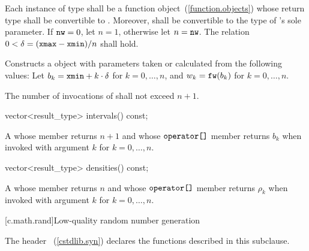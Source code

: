 \begin{itemdescr}
\pnum\requires
 Each instance of type 
 shall be a function object~(\ref{function.objects})
 whose return type shall be convertible to .
 Moreover,
  shall be convertible
 to the type of 's sole parameter.
 If $ \texttt{nw} = 0 $, let $ n = 1 $, otherwise let $n = \texttt{nw}$.
 The relation $ 0 < \delta = (\texttt{xmax} - \texttt{xmin}) / n $
 shall hold.

\pnum\effects Constructs a  object
 with parameters taken or calculated
 from the following values:
 Let $ b_k = \texttt{xmin} + k \cdot \delta $ for $ k = 0, \ldots, n $,
 and $ w_k = \texttt{fw}(b_k) $ for $ k = 0, \ldots, n $.

\pnum\complexity
 The number of invocations of  shall not exceed $n+1$.
\end{itemdescr}

%
\begin{itemdecl}
vector<result_type> intervals() const;
\end{itemdecl}

\begin{itemdescr}
\pnum\returns A 
 whose  member returns $n + 1$
 and whose $ \texttt{operator[]} $ member returns $b_k$
 when invoked with argument $k$ for $k = 0, \ldots, n $.
\end{itemdescr}

%
\begin{itemdecl}
vector<result_type> densities() const;
\end{itemdecl}

\begin{itemdescr}
\pnum\returns A 
 whose  member returns $n$
 and whose $ \texttt{operator[]} $ member returns $\rho_k$
 when invoked with argument $k$ for $ k = 0, \ldots, n $.
\end{itemdescr}%
%
%
%
%

[c.math.rand]{Low-quality random number generation}

\pnum
{}%
\begin{note}
The header ~(\ref{cstdlib.syn})
declares the functions described in this subclause.
\end{note}

